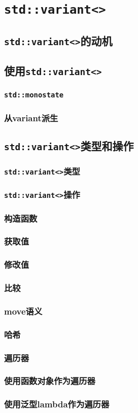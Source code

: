 \section{\texttt{std::variant<>}}\label{ch16}

\subsection{\texttt{std::variant<>}的动机}

\subsection{使用\texttt{std::variant<>}}
\subsubsection*{\texttt{std::monostate}}
\subsubsection*{从variant派生}

\subsection{\texttt{std::variant<>}类型和操作}

\subsubsection{\texttt{std::variant<>}类型}

\subsubsection{\texttt{std::variant<>}操作}
\subsubsection*{构造函数}
\subsubsection*{获取值}
\subsubsection*{修改值}
\subsubsection*{比较}
\subsubsection*{move语义}
\subsubsection*{哈希}

\subsubsection{遍历器}
\subsubsection*{使用函数对象作为遍历器}
\subsubsection*{使用泛型lambda作为遍历器}\label{ch16.3.3.2}
